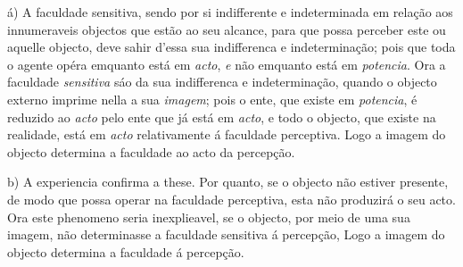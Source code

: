 
 

á) A faculdade sensitiva, sendo por si indifferente e indeterminada em relação aos innumeraveis objectos que estão ao seu alcance, para que possa perceber este ou aquelle objecto, deve sahir d'essa sua indifferenca e indeterminação; pois que toda o agente opéra emquanto está em \emph{acto}, \emph{e} não emquanto está em \emph{potencia}. Ora a faculdade \emph{sensitiva} sáo da sua indifferenca   e indeterminação, quando o objecto externo imprime nella a sua \emph{imagem}; pois o ente, que existe em \emph{potencia}, é reduzido ao \emph{acto} pelo ente que já está em \emph{acto}, e todo o objecto, que existe na realidade, está em \emph{acto} relativamente á faculdade perceptiva. Logo a imagem do objecto determina a faculdade ao acto da percepção.

b) A experiencia confirma a these. Por quanto, se o objecto não estiver presente, de modo que possa operar na faculdade perceptiva, esta não produzirá o seu acto. Ora este phenomeno   seria inexplieavel, se o objecto, por meio de uma sua imagem, não determinasse a faculdade sensitiva á percepção, Logo a imagem do objecto determina a faculdade á percepção.

